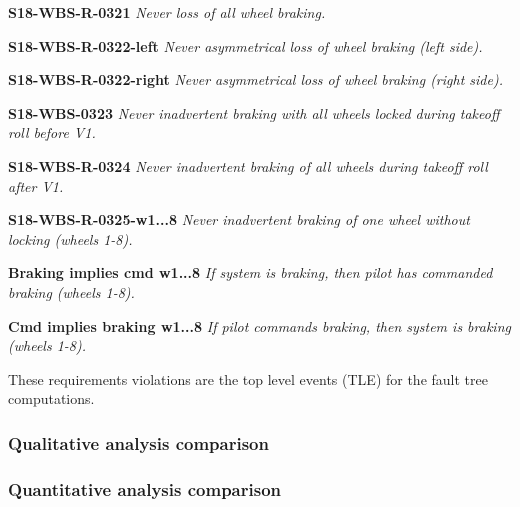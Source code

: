 \textbf{S18-WBS-R-0321} \textit{Never loss of all wheel braking.}

\textbf{S18-WBS-R-0322-left} \textit{Never asymmetrical loss of wheel braking (left side).}

\textbf{S18-WBS-R-0322-right} \textit{Never asymmetrical loss of wheel braking (right side).}

\textbf{S18-WBS-0323} \textit{Never inadvertent braking with all wheels locked during takeoff roll before V1.}

\textbf{S18-WBS-R-0324} \textit{Never inadvertent braking of all wheels during takeoff roll after V1.}

\textbf{S18-WBS-R-0325-w1...8} \textit{Never inadvertent braking of one wheel without locking (wheels 1-8).} 

\textbf{Braking implies cmd w1...8} \textit{If system is braking, then pilot has commanded braking (wheels 1-8).} 

\textbf{Cmd implies braking w1...8} \textit{If pilot commands braking, then system is braking (wheels 1-8).} 

These requirements violations are the top level events (TLE) for the fault tree computations. 


\subsubsection{Qualitative analysis comparison}
\subsubsection{Quantitative analysis comparison}
